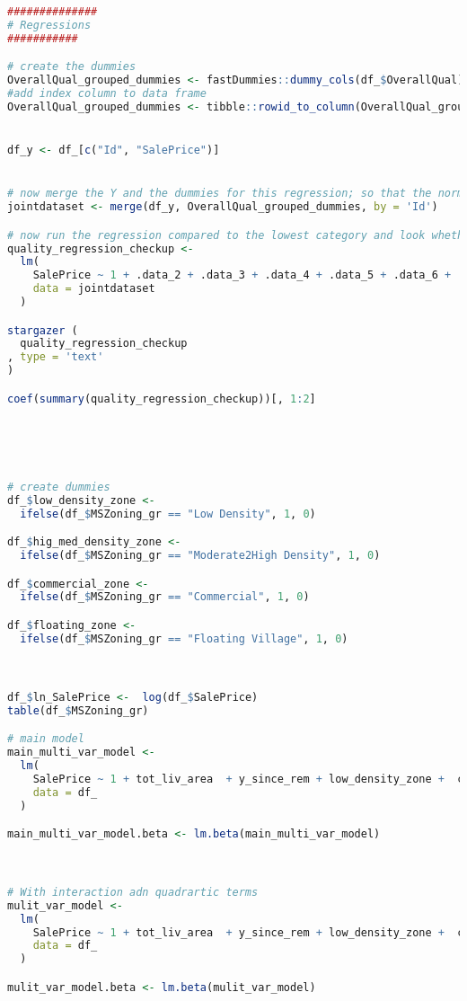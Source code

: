 \documentclass[a4paper]{article}
\begin{document}
\begin{lstlisting}[language=R]
##############
# Regressions
###########

# create the dummies
OverallQual_grouped_dummies <- fastDummies::dummy_cols(df_$OverallQual)
#add index column to data frame
OverallQual_grouped_dummies <- tibble::rowid_to_column(OverallQual_grouped_dummies, "Id")


df_y <- df_[c("Id", "SalePrice")] 


# now merge the Y and the dummies for this regression; so that the normal regression equation can be done
jointdataset <- merge(df_y, OverallQual_grouped_dummies, by = 'Id')

# now run the regression compared to the lowest category and look whether there are natural steps between the variabels 
quality_regression_checkup <-
  lm(
    SalePrice ~ 1 + .data_2 + .data_3 + .data_4 + .data_5 + .data_6 + .data_7 + .data_8 + .data_9 + .data_10,
    data = jointdataset
  )

stargazer (
  quality_regression_checkup
, type = 'text'
)

coef(summary(quality_regression_checkup))[, 1:2]





# create dummies
df_$low_density_zone <-
  ifelse(df_$MSZoning_gr == "Low Density", 1, 0)

df_$hig_med_density_zone <-
  ifelse(df_$MSZoning_gr == "Moderate2High Density", 1, 0)

df_$commercial_zone <-
  ifelse(df_$MSZoning_gr == "Commercial", 1, 0)

df_$floating_zone <-
  ifelse(df_$MSZoning_gr == "Floating Village", 1, 0)



df_$ln_SalePrice <-  log(df_$SalePrice)
table(df_$MSZoning_gr)

# main model
main_multi_var_model <-
  lm(
    SalePrice ~ 1 + tot_liv_area  + y_since_rem + low_density_zone +  commercial_zone + floating_zone,
    data = df_
  )

main_multi_var_model.beta <- lm.beta(main_multi_var_model)



# With interaction adn quadrartic terms
mulit_var_model <-
  lm(
    SalePrice ~ 1 + tot_liv_area  + y_since_rem + low_density_zone +  commercial_zone + floating_zone + I(tot_liv_area ^2) + tot_liv_area * low_density_zone + tot_liv_area * commercial_zone + tot_liv_area * floating_zone ,
    data = df_
  )

mulit_var_model.beta <- lm.beta(mulit_var_model)



\end{lstlisting}
\end{document}
